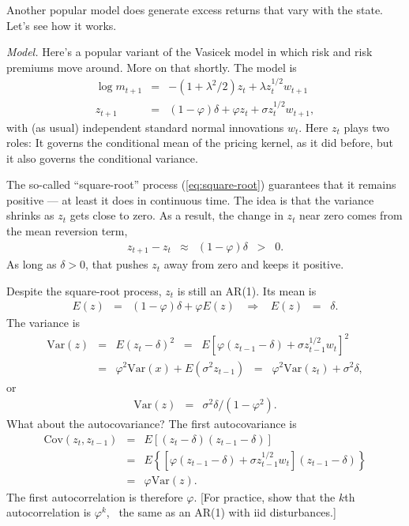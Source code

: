 \documentclass[11pt]{article}
\begin{document}
Another popular model does generate excess returns that vary with the state.
Let's see how it works.

{\it Model.\/}
Here's a popular variant of the Vasicek model
in which risk and risk premiums move around.
More on that shortly.
The model is
\begin{eqnarray}
    \log m_{t+1} &=& - (1+\lambda^2/2 ) z_t + \lambda z_t^{1/2} w_{t+1} \nonumber \\
         z_{t+1} &=& (1-\varphi) \delta + \varphi z_t + \sigma z_t^{1/2} w_{t+1} ,
         \label{eq:square-root}
\end{eqnarray}
with (as usual) independent standard normal innovations $w_t$.
Here $z_t$ plays two roles:  It governs the conditional mean
of the pricing kernel, as it did before,
but it also governs the conditional variance.

The so-called ``square-root'' process (\ref{eq:square-root}) guarantees that
it remains positive --- at least it does in continuous time.
The idea is that the variance shrinks as $z_t$ gets close to zero.
As a result, the change in $z_t$ near zero comes from the mean reversion term,
\begin{eqnarray*}
       z_{t+1} - z_t  &\approx& (1-\varphi) \delta  \;\;>\;\; 0.
\end{eqnarray*}
As long as $\delta>0$, that pushes $z_t$ away from zero and keeps it positive.


Despite the square-root process, $z_t$ is still an AR(1).
Its mean is
\begin{eqnarray*}
    E(z) &=& (1-\varphi) \delta + \varphi E(z)
            \;\;\;\Rightarrow\;\;\; E(z) \;\;=\;\; \delta .
\end{eqnarray*}
The variance is
\begin{eqnarray*}
    \mbox{Var}(z) &=& E (z_t - \delta)^2
                \;\;=\;\; E \left[ \varphi (z_{t-1} - \delta) + \sigma z_{t-1}^{1/2} w_t \right]^2 \\
                &=& \varphi^2 \mbox{Var}(x) + E (\sigma^2 z_{t-1})
                \;\;=\;\;  \varphi^2 \mbox{Var}(z_{t}) + \sigma^2 \delta ,
\end{eqnarray*}
or
\begin{eqnarray*}
    \mbox{Var}(z) &=&   \sigma^2 \delta / (1-\varphi^2) .
\end{eqnarray*}
What about the autocovariance?
The first autocovariance is
\begin{eqnarray*}
    \mbox{Cov}(z_t,z_{t-1}) &=& E [(z_t - \delta)(z_{t-1} - \delta)]  \\
                &=& E  \left\{ [ \varphi (z_{t-1} - \delta) + \sigma z_{t-1}^{1/2} w_t ]
                (z_{t-1} - \delta) \right\} \\
                &=& \varphi \mbox{Var}(z) .
\end{eqnarray*}
The first autocorrelation is therefore $\varphi$.
[For practice, show that the $k$th autocorrelation is $\varphi^k$, \
the same as an AR(1) with iid disturbances.]
\end{document}
